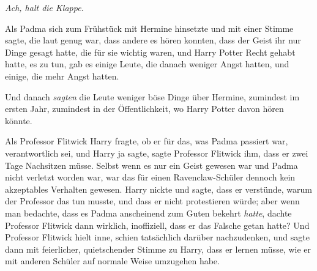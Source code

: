 \emph{Ach, halt die Klappe.}

\later

Als Padma sich zum Frühstück mit Hermine hinsetzte und mit einer Stimme sagte, die laut genug war, dass andere es hören konnten, dass der Geist ihr nur Dinge gesagt hatte, die für sie wichtig waren, und Harry Potter Recht gehabt hatte, es zu tun, gab es einige Leute, die danach weniger Angst hatten, und einige, die mehr Angst hatten.

Und danach \emph{sagten} die Leute weniger böse Dinge über Hermine, zumindest im ersten Jahr, zumindest in der Öffentlichkeit, wo Harry Potter davon hören könnte.

Als Professor Flitwick Harry fragte, ob er für das, was Padma passiert war, verantwortlich sei, und Harry ja sagte, sagte Professor Flitwick ihm, dass er zwei Tage Nachsitzen müsse. Selbst wenn es nur ein Geist gewesen war und Padma nicht verletzt worden war, war das für einen Ravenclaw-Schüler dennoch kein akzeptables Verhalten gewesen. Harry nickte und sagte, dass er verstünde, warum der Professor das tun musste, und dass er nicht protestieren würde; aber wenn man bedachte, dass es Padma anscheinend zum Guten bekehrt \emph{hatte}, dachte Professor Flitwick dann wirklich, inoffiziell, dass er das Falsche getan hatte? Und Professor Flitwick hielt inne, schien tatsächlich darüber nachzudenken, und sagte dann mit feierlicher, quietschender Stimme zu Harry, dass er lernen müsse, wie er mit anderen Schüler auf normale Weise umzugehen habe.

